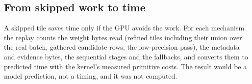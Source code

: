 \subsection{From skipped work to time}\label{app:transport-work}
A skipped tile saves time only if the GPU avoids the work. For each mechanism the replay counts the weight bytes read (refined tiles including their union over the real batch, gathered candidate rows, the low-precision pass), the metadata and evidence bytes, the sequential stages and the fallbacks, and converts them to predicted time with the kernel's measured primitive costs. The result would be a model prediction, not a timing, and it was not computed.
